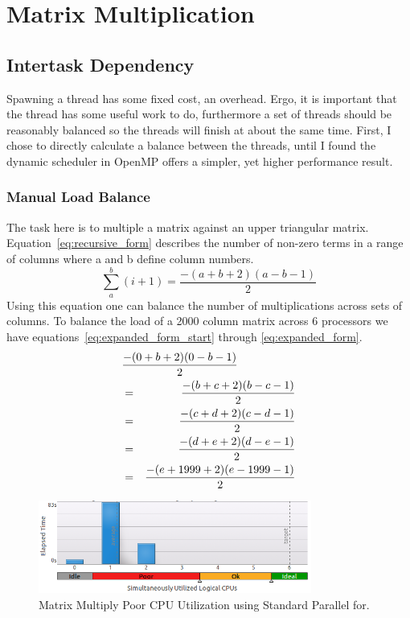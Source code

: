 \documentclass[journal,10pt,onecolumn]{IEEEtran}
\begin{document}
\section{Matrix Multiplication}

\subsection{Intertask Dependency}
Spawning a thread has some fixed cost, an overhead.  Ergo, it is important that the thread has some 
useful work to do, furthermore a set of threads should be reasonably balanced so the threads will 
finish at about the same time.  First, I chose to directly calculate a balance between the threads,
until I found the dynamic scheduler in OpenMP offers a simpler, yet higher performance result.

\subsubsection{Manual Load Balance}

The task here is to multiple a matrix against an upper triangular matrix.  Equation~\ref{eq:recursive_form}
describes the number of non-zero terms in a range of columns where a and b define column numbers.  
\begin{equation}
\sum\limits_{a}^b (i + 1) = \frac{-(a + b + 2)(a - b -1)}{2}
\label{eq:recursive_form}
\end{equation}
Using this equation one can balance the number of 
multiplications across sets of columns.  To balance the load of a 2000 column matrix 
across 6 processors we have equations~\ref{eq:expanded_form_start} through \ref{eq:expanded_form}.
\begin{eqnarray}
\label{eq:expanded_form_start}
\lefteqn{\frac{-(0 + b + 2)(0 - b -1)}{2}} \\
& = & \frac{-(b + c + 2)(b - c -1)}{2} \\
& = & \frac{-(c + d + 2)(c - d -1)}{2} \\
& = & \frac{-(d + e + 2)(d - e -1)}{2} \\
& = & \frac{-(e + 1999 + 2)(e - 1999 -1)}{2}
\label{eq:expanded_form}
\end{eqnarray}

\begin{figure}[!t]
\begin{center}
\includegraphics[width=0.8\textwidth]{figures/matrix_without_dynamic_schedule_cpu_usage.png}
\caption{Matrix Multiply Poor CPU Utilization using Standard Parallel for.}
\label{fig:matrix_wo_dynamic_schedule_cpu_usage}
\end{center}
\end{figure}
\end{document}
